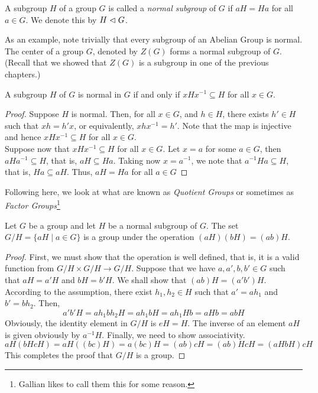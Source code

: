 \begin{definition}
	A subgroup $H$ of a group $G$ is called a \textit{normal subgroup} of $G$ if $aH=Ha$ for all $a\in G$. We denote this by $H\vartriangleleft G$.
\end{definition}

As an example, note trivially that every subgroup of an Abelian Group is normal.\\
The center of a group $G$, denoted by $Z(G)$ forms a normal subgroup of $G$. (Recall that we showed that $Z(G)$ is a subgroup in one of the previous chapters.)

\begin{proposition}
	A subgroup $H$ of $G$ is normal in $G$ if and only if $xHx^{-1}\subseteq H$ for all $x\in G$.
\end{proposition}
\begin{proof}
	Suppose $H$ is normal. Then, for all $x\in G$, and $h\in H$, there exists $h'\in H$ such that $xh=h'x$, or equivalently, $xhx^{-1}=h'$. Note that the map is injective and hence $xHx^{-1}\subseteq H$ for all $x\in G$.\\
	Suppose now that $xHx^{-1}\subseteq H$ for all $x\in G$. Let $x=a$ for some $a\in G$, then $aHa^{-1}\subseteq H$, that is, $aH\subseteq Ha$. Taking now $x=a^{-1}$, we note that $a^{-1}Ha\subseteq H$, that is, $Ha\subseteq aH$. Thus, $aH=Ha$ for all $a\in G$
\end{proof}

Following here, we look at what are known as \textit{Quotient Groups} or sometimes as \textit{Factor Groups}\footnote{Gallian likes to call them this for some reason.}

\begin{theorem}[Holder, 1889]
	Let $G$ be a group and let $H$ be a normal subgroup of $G$. The set $G/H=\{aH\mid a\in G\}$ is a group under the operation $(aH)(bH)=(ab)H$.
\end{theorem}
\begin{proof}
	First, we must show that the operation is well defined, that is, it is a valid function from $G/H\times G/H\to G/H$. Suppose that we have $a,a',b,b'\in G$ such that $aH=a'H$ and $bH=b'H$. We shall show that $(ab)H=(a'b')H$. According to the assumption, there exist $h_1,h_2\in H$ such that $a'=ah_1$ and $b'=bh_2$. Then,
	$$
	a'b'H = ah_1bh_2H = ah_1bH = ah_1Hb = aHb = abH
	$$
	Obviously, the identity element in $G/H$ is $eH=H$. The inverse of an element $aH$ is given obviously by $a^{-1}H$. Finally, we need to show associativity.
	$$
	aH(bHcH) = aH((bc)H) = a(bc)H = (ab)cH = (ab)HcH = (aHbH)cH
	$$
	This completes the proof that $G/H$ is a group.
\end{proof}

